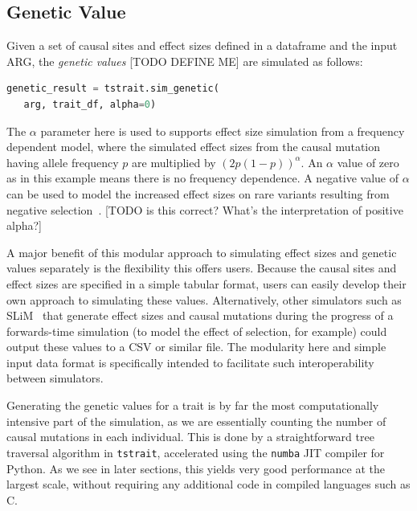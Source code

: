 \documentclass[unnumsec,webpdf,modern,large,namedate]{oup-authoring-template}%
\begin{document}
\subsection{Genetic Value}
Given a set of causal sites and effect sizes defined in a dataframe
and the input ARG, the \emph{genetic values} [TODO DEFINE ME]
are simulated as follows:
\begin{lstlisting}[language=Python]
genetic_result = tstrait.sim_genetic(
   arg, trait_df, alpha=0)
\end{lstlisting}
The $\alpha$ parameter here is used to
supports effect size simulation from a frequency
dependent model, where the simulated effect sizes from the causal mutation
having allele frequency $p$ are multiplied by $\left(2p(1-p)\right)^\alpha$.
An $\alpha$ value of zero as in this example means there is
no frequency dependence. A negative value of $\alpha$
can be used to model the increased effect sizes on rare variants
resulting from negative selection~\citep{speed2017}.
[TODO is this correct? What's the interpretation of positive alpha?]

A major benefit of this modular approach to simulating effect sizes
and genetic values separately is the flexibility this offers
users. Because the causal sites and effect sizes are specified in a
simple tabular format, users can easily develop their own approach
to simulating these values. Alternatively, other simulators
such as SLiM~\citep{haller2023} that generate effect sizes and
causal mutations during the progress of a forwards-time simulation
(to model the effect of selection, for example) could output these
values to a CSV or similar file. The modularity here and simple
input data format is specifically intended to facilitate such
interoperability between simulators.

Generating the genetic values for a trait is by far the
most computationally intensive part of the simulation,
as we are essentially counting the number
of causal mutations in each individual. This is done by a
straightforward tree traversal algorithm in \texttt{tstrait},
accelerated using the \texttt{numba} JIT compiler for Python.
As we see in later sections, this yields very good performance
at the largest scale, without requiring any additional code in
compiled languages such as C.
\end{document}

